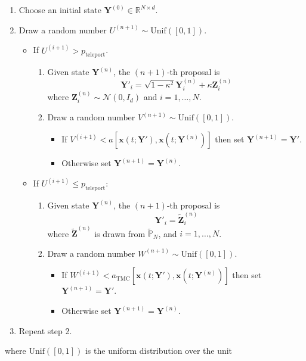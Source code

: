 \begin{enumerate}

\item Choose an initial state $\mathbf{Y}^{(0)} \in \mathbb{R}^{N \times d}$.

\item Draw a random number $U^{(n+1)} \sim \text{Unif}([0,1])$.

\begin{itemize}

	\item If $U^{(i+1)} > p_\text{teleport}$.
		\begin{enumerate}
	
			\item Given state $\mathbf{Y}^{(n)}$, the $(n+1)$-th proposal is
				\begin{equation}
					\mathbf{Y}'_i = \sqrt{1 - \kappa^2} \mathbf{Y}_i^{(n)} + \kappa \mathbf{Z}_i^{(n)}
				\end{equation}
				where $\mathbf{Z}_i^{(n)} \sim \mathcal{N}(0,I_d)$ and $i=1,\dots,N$.
			
			\item Draw a random number $V^{(n+1)} \sim \text{Unif}([0,1])$.
			\begin{itemize}
				\item If $V^{(i+1)} < a[\mathbf{x}(t;\mathbf{Y}'), \mathbf{x}(t;\mathbf{Y}^{(n)})]$ then set $\mathbf{Y}^{(n+1)} = \mathbf{Y}'$.
				\item Otherwise set  $\mathbf{Y}^{(n+1)} = \mathbf{Y}^{(n)}$.
			\end{itemize}
	
		\end{enumerate}

	\item If $U^{(i+1)} \leq p_\text{teleport}$:

		\begin{enumerate}
			\item Given state $\mathbf{Y}^{(n)}$, the $(n+1)$-th proposal is
				\begin{equation}
					\mathbf{Y}'_i = \tilde{\mathbf{Z}}_{i}^{(n)}
				\end{equation}
				where $\tilde{\mathbf{Z}}^{(n)}$ is drawn from $\tilde{\mathbb{P}}_N$, and  $i=1,\dots,N$.
			
			\item Draw a random number $W^{(n+1)} \sim \text{Unif}([0,1])$.
			\begin{itemize}
				\item If $W^{(i+1)} < a_\text{TMC}[\mathbf{x}(t;\mathbf{Y}'), \mathbf{x}(t;\mathbf{Y}^{(n)})]$ then set $\mathbf{Y}^{(n+1)} = \mathbf{Y}'$.
				\item Otherwise set  $\mathbf{Y}^{(n+1)} = \mathbf{Y}^{(n)}$.
			\end{itemize}
		\end{enumerate}

\end{itemize}

\item Repeat step 2.

\end{enumerate}where $\text{Unif}([0,1])$ is the uniform distribution over the unit
